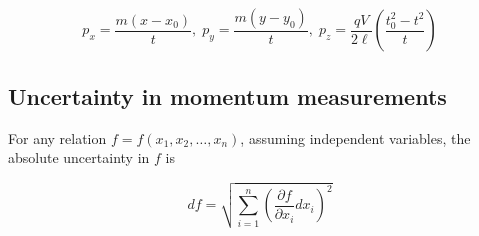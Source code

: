\begin{equation}
p_x = \frac{m(x-x_0)}{t} ,\;
p_y = \frac{m(y-y_0)}{t} ,\;
p_z = \frac{qV}{2\ell} \left( \frac{t_0^2 - t^2}{t} \right)
\end{equation}

\subsection{Uncertainty in momentum measurements}
For any relation $f = f(x_1, x_2, \dots, x_n)$, assuming independent variables, the absolute uncertainty in $f$ is

\begin{equation}
df = \sqrt{\sum_{i=1}^{n} \left( \frac{\partial f}{\partial x_i} dx_i \right)^2}
\end{equation}
